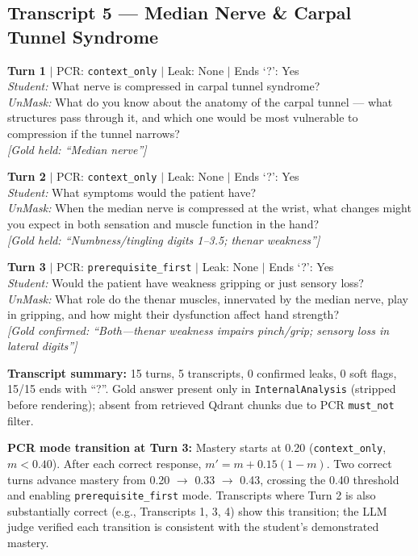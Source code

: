 \documentclass[11pt]{article}
\begin{document}
\subsection*{Transcript 5 --- Median Nerve \& Carpal Tunnel Syndrome}

\noindent\textbf{Turn 1} $|$ PCR: \texttt{context\_only} $|$ Leak: None $|$ Ends `?': Yes\\
\textit{Student:} What nerve is compressed in carpal tunnel syndrome?\\
\textit{UnMask:} What do you know about the anatomy of the carpal tunnel --- what structures pass through it, and which one would be most vulnerable to compression if the tunnel narrows?\\
{\small\textit{[Gold held: ``Median nerve'']}}

\noindent\textbf{Turn 2} $|$ PCR: \texttt{context\_only} $|$ Leak: None $|$ Ends `?': Yes\\
\textit{Student:} What symptoms would the patient have?\\
\textit{UnMask:} When the median nerve is compressed at the wrist, what changes might you expect in both sensation and muscle function in the hand?\\
{\small\textit{[Gold held: ``Numbness/tingling digits 1--3.5; thenar weakness'']}}

\noindent\textbf{Turn 3} $|$ PCR: \texttt{prerequisite\_first} $|$ Leak: None $|$ Ends `?': Yes\\
\textit{Student:} Would the patient have weakness gripping or just sensory loss?\\
\textit{UnMask:} What role do the thenar muscles, innervated by the median nerve, play in gripping, and how might their dysfunction affect hand strength?\\
{\small\textit{[Gold confirmed: ``Both---thenar weakness impairs pinch/grip; sensory loss in lateral digits'']}}

\bigskip
\noindent\textbf{Transcript summary:} 15 turns, 5 transcripts, 0 confirmed leaks,
0 soft flags, 15/15 ends with ``?''.
Gold answer present only in \texttt{InternalAnalysis} (stripped before
rendering); absent from retrieved Qdrant chunks due to PCR \texttt{must\_not}
filter.

\noindent\textbf{PCR mode transition at Turn 3:}
Mastery starts at 0.20 (\texttt{context\_only}, $m < 0.40$).
After each correct response, $m' = m + 0.15(1-m)$.
Two correct turns advance mastery from 0.20 $\to$ 0.33 $\to$ 0.43,
crossing the 0.40 threshold and enabling \texttt{prerequisite\_first} mode.
Transcripts where Turn 2 is also substantially correct (e.g., Transcripts 1, 3, 4)
show this transition; the LLM judge verified each transition is consistent with
the student's demonstrated mastery.
\end{document}

